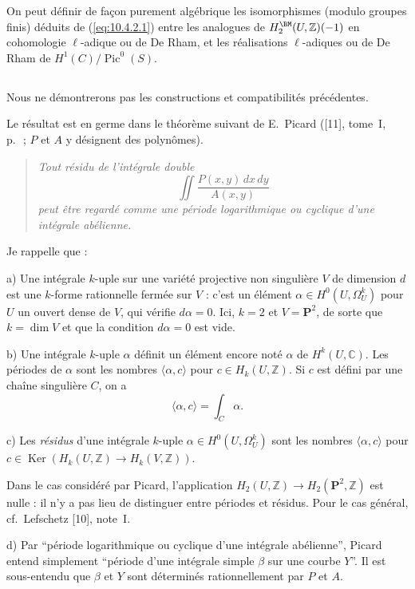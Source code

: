 \documentclass[12pt,a4paper]{amsart}
\theoremstyle{plain}
\theoremstyle{definition}
\theoremstyle{remark}
\DeclareMathOperator{\Ker}{Ker}
\DeclareMathOperator{\Pic}{Pic}
\numberwithin{equation}{section}
\begin{document}
On peut définir de façon purement algébrique les isomorphismes (modulo groupes finis) déduits de (\ref{eq:10.4.2.1}) entre les analogues de $H_2^\BM(U,\mathbb{Z})(-1)$ en cohomologie $\ell$-adique ou de De Rham, et les réalisations $\ell$-adiques ou de De Rham de $H^1(C)/\Pic^0(S)$.

\subsection{}\label{10.4.3}
Nous ne démontrerons pas les constructions et compatibilités précédentes.

Le résultat est en germe dans le théorème suivant de E.~Picard ([11], tome~I, p.~\,; $P$ et $A$ y désignent des polynômes).

\begin{quote}
\textit{Tout résidu de l'intégrale double
\[
\iint\frac{P(x,y)\,dx\,dy}{A(x,y)}
\]
peut être regardé comme une période logarithmique ou cyclique d'une intégrale abélienne.}
\end{quote}

Je rappelle que :

a) Une intégrale $k$-uple sur une variété projective non singulière $V$ de dimension $d$ est une $k$-forme rationnelle fermée sur $V$ : c'est un élément $\alpha\in H^0(U,\Omega_U^k)$ pour $U$ un ouvert dense de $V$, qui vérifie $d\alpha=0$. Ici, $k=2$ et $V=\mathbf{P}^2$, de sorte que $k=\dim V$ et que la condition $d\alpha=0$ est vide.

b) Une intégrale $k$-uple $\alpha$ définit un élément encore noté $\alpha$ de $H^k(U,\mathbb{C})$. Les périodes de $\alpha$ sont les nombres $\langle\alpha,c\rangle$ pour $c\in H_k(U,\mathbb{Z})$. Si $c$ est défini par une chaîne singulière $C$, on a
\[
\langle\alpha,c\rangle=\int_C\alpha.
\]

c) Les \textit{résidus} d'une intégrale $k$-uple $\alpha\in H^0(U,\Omega_U^k)$ sont les nombres $\langle\alpha,c\rangle$ pour $c\in\Ker(H_k(U,\mathbb{Z})\to H_k(V,\mathbb{Z}))$.

Dans le cas considéré par Picard, l'application $H_2(U,\mathbb{Z})\to H_2(\mathbf{P}^2,\mathbb{Z})$ est nulle : il n'y a pas lieu de distinguer entre périodes et résidus. Pour le cas général, cf.~Lefschetz [10], note~I.

d) Par ``période logarithmique ou cyclique d'une intégrale abélienne'', Picard entend simplement ``période d'une intégrale simple $\beta$ sur une courbe $Y$''. Il est sous-entendu que $\beta$ et $Y$ sont déterminés rationnellement par $P$ et $A$.
\end{document}

